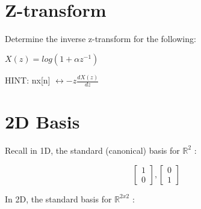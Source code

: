 \documentclass[11pt]{article}
\begin{document}
\section{Z-transform}

Determine the inverse z-transform for the following:

\begin{center}

\vspace{4mm}

$
X(z) = log( 1 + \alpha z^{-1})
$
\end{center}

\vspace{3mm}

\begin{center}
HINT:  nx[n] $\longleftrightarrow -z \frac{dX(z)}{dz}$
\end{center}


\section{2D Basis}

Recall in 1D, the standard (canonical) basis for $\mathbb{R}^2$ :

\begin{center}
\[
\begin{bmatrix}
   1        \\
    0      
            
\end{bmatrix}
,
\begin{bmatrix}
      0        \\
    1      
\end{bmatrix}
\]
\end{center}

In 2D, the standard basis for $\mathbb{R}^{2x2}$ :
\end{document}
